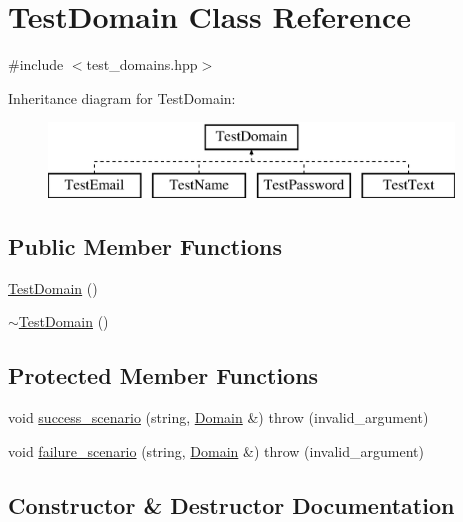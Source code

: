 \hypertarget{class_test_domain}{}\section{Test\+Domain Class Reference}
\label{class_test_domain}


{\ttfamily \#include $<$test\+\_\+domains.\+hpp$>$}

Inheritance diagram for Test\+Domain\+:\begin{figure}[H]
\begin{center}
\leavevmode
\includegraphics[height=2.000000cm]{class_test_domain}
\end{center}
\end{figure}
\subsection*{Public Member Functions}
\begin{DoxyCompactItemize}
\item 
\hyperlink{class_test_domain_aca311894bf6af9feb53c83a3659f208b}{Test\+Domain} ()
\item 
\hyperlink{class_test_domain_ab5be880050c36e6dcc470a452b4b9f69}{$\sim$\+Test\+Domain} ()
\end{DoxyCompactItemize}
\subsection*{Protected Member Functions}
\begin{DoxyCompactItemize}
\item 
void \hyperlink{class_test_domain_a9945e79f1f6d965e6b58f149b2c8cf84}{success\+\_\+scenario} (string, \hyperlink{class_domain}{Domain} \&)  throw (invalid\+\_\+argument)
\item 
void \hyperlink{class_test_domain_a026682e48bdb2ffdf6b3d353c7f055fe}{failure\+\_\+scenario} (string, \hyperlink{class_domain}{Domain} \&)  throw (invalid\+\_\+argument)
\end{DoxyCompactItemize}


\subsection{Constructor \& Destructor Documentation}
\mbox{\label{class_test_domain_aca311894bf6af9feb53c83a3659f208b}} 
